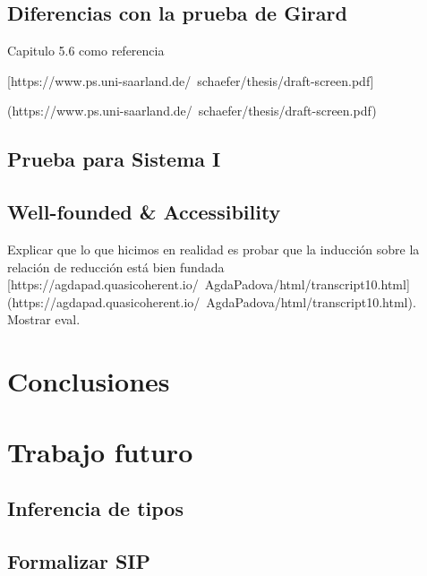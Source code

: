 \documentclass[]{report}
\begin{document}
	\subsection{Diferencias con la prueba de Girard}
	Capitulo 5.6 como referencia
	
	[https://www.ps.uni-saarland.de/~schaefer/thesis/draft-screen.pdf] 
	
	(https://www.ps.uni-saarland.de/~schaefer/thesis/draft-screen.pdf)
	\subsection{Prueba para Sistema I}
	\subsection{Well-founded \& Accessibility}
	Explicar que lo que hicimos en realidad es probar que la inducción sobre la relación de reducción está bien fundada
	[https://agdapad.quasicoherent.io/~AgdaPadova/html/transcript10.html]
	(https://agdapad.quasicoherent.io/~AgdaPadova/html/transcript10.html).
	Mostrar eval.
	
	\section{Conclusiones}
	
	
	\section{Trabajo futuro}
	\subsection{Inferencia de tipos}
	\subsection{Formalizar SIP}
	
	
	\printbibliography
	
\end{document}
